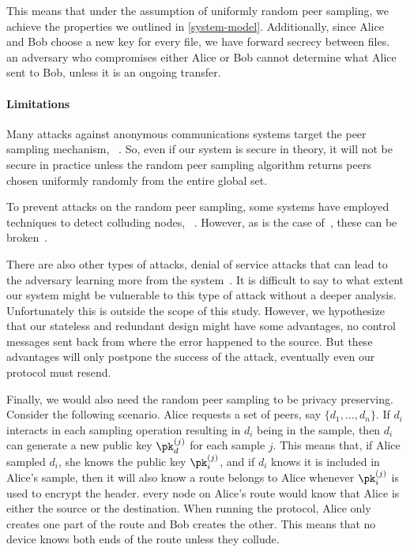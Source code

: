 This means that under the assumption of uniformly random peer sampling, we 
achieve the properties we outlined in \cref{system-model}.
Additionally, since Alice and Bob choose a new key for every file, we have 
forward secrecy between files.
\Eg an adversary who compromises either Alice or Bob cannot determine what Alice 
sent to Bob, unless it is an ongoing transfer.

\paragraph*{Limitations}%
\label{security-limitations}

Many attacks against anonymous communications systems target the peer sampling 
mechanism, \eg~\cite{%
  RouteFingerprinting,%
  EpistemicAttacksOnRouteSelection,%
}.
So, even if our system is secure in theory, it will not be secure in practice 
unless the random peer sampling algorithm returns peers chosen uniformly 
randomly from the entire global set. %

To prevent attacks on the random peer sampling, some systems have employed 
techniques to detect colluding nodes, \eg~\cite{%
  SecurePeerSampling,%
  MorphMix,%
}.
However, as is the case of~\cite{MorphMix}, these can be 
broken~\cite{BreakingMorphMix}.

There are also other types of attacks, \eg denial of service attacks that can 
lead to the adversary learning more from the system~\cite{DenialOfSecurity}.
It is difficult to say to what extent our system might be vulnerable to this 
type of attack without a deeper analysis.
Unfortunately this is outside the scope of this study.
However, we hypothesize that our stateless and redundant design might have some 
advantages, \eg no control messages sent back from where the error happened to 
the source.
But these advantages will only postpone the success of the attack, eventually 
even our protocol must resend.

Finally, we would also need the random peer sampling to be privacy preserving.
Consider the following scenario.
Alice requests a set of peers, say \(\{d_1, \dotsc, d_n\}\).
If \(d_i\) interacts in each sampling operation resulting in \(d_i\) being in 
the sample, then \(d_i\) can generate a new public key \(\pk_d^{(j)}\) for each 
sample \(j\).
This means that, if Alice sampled \(d_i\), she knows the public key 
\(\pk_i^{(j)}\), and if \(d_i\) knows it is included in Alice's sample, then it 
will also know a route belongs to Alice whenever \(\pk_i^{(j)}\) is used to 
encrypt the header.
\Ie every node on Alice's route would know that Alice is either the source or 
the destination.
When running the protocol, Alice only creates one part of the route and Bob 
creates the other.
This means that no device knows both ends of the route unless they collude.

